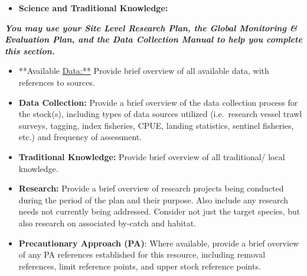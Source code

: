 \documentclass[]{book}
\providecommand{\tightlist}{%
  \setlength{\itemsep}{0pt}\setlength{\parskip}{0pt}}
\begin{document}
\begin{itemize}
\tightlist
\item
  \textbf{Science and Traditional Knowledge:}
\end{itemize}

\textbf{\emph{You may use your Site Level Research Plan, the Global
Monitoring \& Evaluation Plan, and the Data Collection Manual to help
you complete this section.}}

\begin{itemize}
\item
  **Available \url{Data:**} Provide brief overview of all available
  data, with references to sources.
\item
  \textbf{Data Collection:} Provide a brief overview of the data
  collection process for the stock(s), including types of data sources
  utilized (i.e.~research vessel trawl surveys, tagging, index
  fisheries, CPUE, landing statistics, sentinel fisheries, etc.) and
  frequency of assessment.
\item
  \textbf{Traditional Knowledge:} Provide brief overview of all
  traditional/ local knowledge.
\item
  \textbf{Research:} Provide a brief overview of research projects being
  conducted during the period of the plan and their purpose. Also
  include any research needs not currently being addressed. Consider not
  just the target species, but also research on associated by-catch and
  habitat.
\item
  \textbf{Precautionary Approach (PA)}: Where available, provide a brief
  overview of any PA references established for this resource, including
  removal references, limit reference points, and upper stock reference
  points.
\end{itemize}
\end{document}
